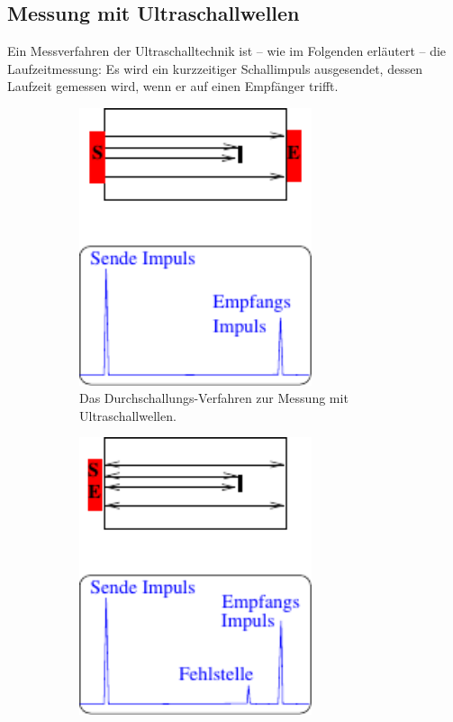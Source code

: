 \subsection{Messung mit Ultraschallwellen}
    Ein Messverfahren der Ultraschalltechnik ist – wie im Folgenden erläutert – die Laufzeitmessung:
    Es wird ein kurzzeitiger Schallimpuls ausgesendet,
    dessen Laufzeit gemessen wird,
    wenn er auf einen Empfänger trifft.\\
    \clearpage
    \begin{figure}
        \centering
        \begin{subfigure}{0.48\textwidth}
            \centering
            \includegraphics[width=0.75\textwidth]{content/img/Abb_1a.pdf}
            \caption{Das Durchschallungs-Verfahren zur Messung mit Ultraschallwellen. \cite{versuchsanleitung}}
            \label{fig:durchschallung}
        \end{subfigure}
        \begin{subfigure}{0.48\textwidth}
            \centering
            \includegraphics[width=0.75\textwidth]{content/img/Abb_1b.pdf}

\end{subfigure}
\end{figure}
